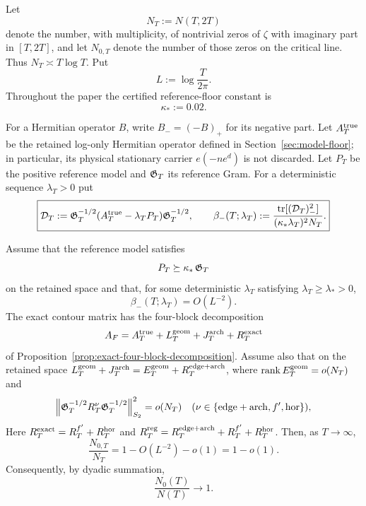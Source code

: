 Let
\[
N_T:=N(T,2T)
\]
denote the number, with multiplicity, of nontrivial zeros of $\zeta$ with
imaginary part in $[T,2T]$, and let $N_{0,T}$ denote the number of those zeros
on the critical line. Thus $N_T\asymp T\log T$. Put
\[
L:=\log\frac{T}{2\pi}.
\]
Throughout the paper the certified reference-floor constant is
\begin{equation}
\boxed{\kappa_*:=0.02.}
\label{eq:global-kappa}
\end{equation}

For a Hermitian operator $B$, write $B_-=(-B)_+$ for its negative part.  Let
$A_T^{\rm true}$ be the retained log-only Hermitian operator defined in
Section~\ref{sec:model-floor}; in particular, its physical stationary carrier
$e(-ne^d)$ is not discarded.  Let $P_T$ be the positive reference model and
$\mathfrak G_T$ its reference Gram.  For a deterministic sequence $\lambda_T>0$ put
\begin{equation}
\boxed{
\mathcal D_T:=\mathfrak G_T^{-1/2}
 (A_T^{\rm true}-\lambda_TP_T)\mathfrak G_T^{-1/2},
\qquad
\beta_-(T;\lambda_T):=
\frac{\operatorname{tr}[(\mathcal D_T)_-^2]}
{(\kappa_*\lambda_T)^2N_T}.}
\label{eq:beta-minus-intro}
\end{equation}

\begin{theorem}
\label{thm:main}
Assume that the reference model satisfies
\[
P_T\succeq\kappa_*\,\mathfrak G_T
\]
on the retained space and that, for some deterministic $\lambda_T$ satisfying
$\lambda_T\ge\lambda_*>0$,
\begin{equation}
\boxed{\beta_-(T;\lambda_T)=O(L^{-2}).}
\label{eq:beta-minus-hypothesis-intro}
\end{equation}
The exact contour matrix has the four-block decomposition
\[
A_F=A_T^{\rm true}+L_T^{\rm geom}+J_T^{\rm arch}+R_T^{\rm exact}
\]
of Proposition~\ref{prop:exact-four-block-decomposition}. Assume also that
on the retained space $L_T^{\rm geom}+J_T^{\rm arch}
=E_T^{\rm geom}+R_T^{\rm edge+arch}$, where
$\operatorname{rank} E_T^{\rm geom}=o(N_T)$ and
\begin{equation}
\left\|\mathfrak G_T^{-1/2}R_T^\nu\mathfrak G_T^{-1/2}\right\|_{S_2}^2=o(N_T)
\quad(\nu\in\{\mathrm{edge+arch},f',\mathrm{hor}\}),
\label{eq:regular-lambda-scale-intro}
\end{equation}
Here $R_T^{\rm exact}=R_T^{f'}+R_T^{\rm hor}$ and
$R_T^{\rm reg}=R_T^{\rm edge+arch}+R_T^{f'}+R_T^{\rm hor}$.
Then, as $T\to\infty$,
\[
\boxed{\frac{N_{0,T}}{N_T}=1-O(L^{-2})-o(1)=1-o(1)}.
\]
Consequently, by dyadic summation,
\[
\boxed{\frac{N_0(T)}{N(T)}\longrightarrow1}.
\]
\end{theorem}

